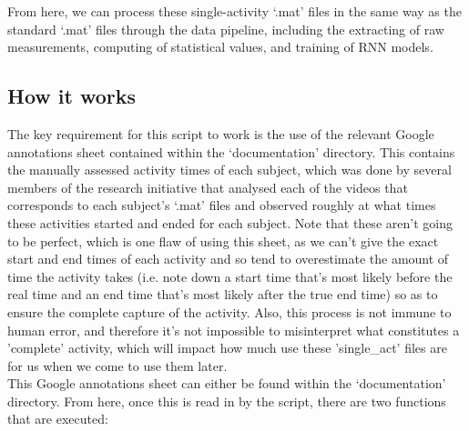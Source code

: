 \documentclass[12pt,twoside]{report}
\begin{document}
\quad From here, we can process these single-activity ‘.mat’ files in the same way as the standard ‘.mat’ files through the data pipeline, including the extracting of raw measurements, computing of statistical values, and training of RNN models.


\subsection{How it works}

\quad The key requirement for this script to work is the use of the relevant Google annotations sheet contained within the ‘documentation’ directory. This contains the manually assessed activity times of each subject, which was done by several members of the research initiative that analysed each of the videos that corresponds to each subject's ‘.mat’ files and observed roughly at what times these activities started and ended for each subject. Note that these aren't going to be perfect, which is one flaw of using this sheet, as we can't give the exact start and end times of each activity and so tend to overestimate the amount of time the activity takes (i.e. note down a start time that's most likely before the real time and an end time that's most likely after the true end time) so as to ensure the complete capture of the activity. Also, this process is not immune to human error, and therefore it's not impossible to misinterpret what constitutes a 'complete' activity, which will impact how much use these 'single\_act' files are for us when we come to use them later.\\

\quad This Google annotations sheet can either be found within the ‘documentation’ directory. From here, once this is read in by the script, there are two functions that are executed:
\end{document}

